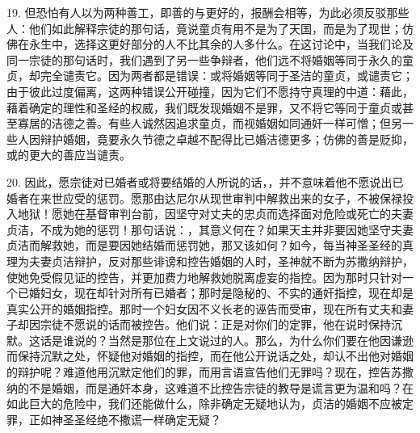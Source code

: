 19. 但恐怕有人以为两种善工，即善的与更好的，报酬会相等，为此必须反驳那些人：他们如此解释宗徒的那句话，竟说童贞有用不是为了天国，而是为了现世；仿佛在永生中，选择这更好部分的人不比其余的人多什么。在这讨论中，当我们论及同一宗徒的那句话时，我们遇到了另一些争辩者，他们远不将婚姻等同于永久的童贞，却完全谴责它。因为两者都是错误：或将婚姻等同于圣洁的童贞，或谴责它；由于彼此过度偏离，这两种错误公开碰撞，因为它们不愿持守真理的中道：藉此，藉着确定的理性和圣经的权威，我们既发现婚姻不是罪，又不将它等同于童贞或甚至寡居的洁德之善。有些人诚然因追求童贞，而视婚姻如同通奸一样可憎；但另一些人因辩护婚姻，竟要永久节德之卓越不配得比已婚洁德更多；仿佛的善是贬抑，或的更大的善应当谴责。\par

20. 因此，愿宗徒对已婚者或将要结婚的人所说的话，，并不意味着他不愿说出已婚者在来世应受的惩罚。愿那由达尼尔从现世审判中解救出来的女子，不被保禄投入地狱！愿她在基督审判台前，因坚守对丈夫的忠贞而选择面对危险或死亡的夫妻贞洁，不成为她的惩罚！那句话说：，其意义何在？如果天主并非要因她坚守夫妻贞洁而解救她，而是要因她结婚而惩罚她，那又该如何？如今，每当神圣圣经的真理为夫妻贞洁辩护，反对那些诽谤和控告婚姻的人时，圣神就不断为苏撒纳辩护，使她免受假见证的控告，并更加费力地解救她脱离虚妄的指控。因为那时只针对一个已婚妇女，现在却针对所有已婚者；那时是隐秘的、不实的通奸指控，现在却是真实公开的婚姻指控。那时一个妇女因不义长老的诬告而受审，现在所有丈夫和妻子却因宗徒不愿说的话而被控告。他们说：正是对你们的定罪，他在说时保持沉默。这话是谁说的？当然是那位在上文说过的人。那么，为什么你们要在他因谦逊而保持沉默之处，怀疑他对婚姻的指控，而在他公开说话之处，却认不出他对婚姻的辩护呢？难道他用沉默定他们的罪，而用言语宣告他们无罪吗？现在，控告苏撒纳的不是婚姻，而是通奸本身，这难道不比控告宗徒的教导是谎言更为温和吗？在如此巨大的危险中，我们还能做什么，除非确定无疑地认为，贞洁的婚姻不应被定罪，正如神圣圣经绝不撒谎一样确定无疑？\par


